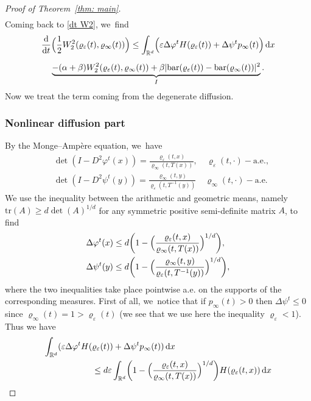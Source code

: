 \documentclass[10pt]{amsart}
\newcommand{\Bprt}[1]{\Bigl(#1\Bigr)}
\newcommand{\bbprt}[1]{\biggl(#1\biggr)}
\newcommand{\dx}[1]{\mathop{}\!\mathrm{d} #1}
\newcommand{\ddt}{\frac{\dx{}}{\dx{t}}}
\newcommand{\R}{\mathbb{R}}
\theoremstyle{plain}
\theoremstyle{remark}
\begin{document}
\begin{proof}[Proof of Theorem~\ref{thm: main}]
\begin{multline*}
\end{multline*}
Coming back to \eqref{dt W2}, we~find
\begin{multline}\label{final_singular}
\ddt \Bprt{\frac 12 W_2^2(\varrho_\varepsilon(t), \varrho_\infty(t))}\leq \int_{\R^d} \Bprt{\varepsilon\Delta \varphi^t H(\varrho_\varepsilon(t)) +\Delta \psi^t p_\infty(t) }\dx x \\[5pt]
\underbrace{- (\alpha+\beta) W_2^2(\varrho_\varepsilon(t), \varrho_\infty(t)) + \beta |\mathrm{bar}(\varrho_\varepsilon(t))- \mathrm{bar}(\varrho_\infty(t))|^2}_{I}.
\end{multline}
Now we treat the term coming from the degenerate diffusion.

\subsubsection*{Nonlinear diffusion part}
By the Monge--Ampère equation, we~have
\begin{align*}
&\det (I - D^2 \varphi^t(x)) = \frac{\varrho_\varepsilon(t,x)}{\varrho_\infty(t,T (x))}, \quad \varrho_{\varepsilon}(t,\cdot)-\mathrm{a.e.},\\
&\det (I - D^2 \psi^t(y)) = \frac{\varrho_\infty(t,y)}{\varrho_\varepsilon(t,T^{-1}(y))} \quad \varrho_{\infty}(t,\cdot)-\mathrm{a.e.}
\end{align*}
We use the inequality between the arithmetic and geometric means, namely $\mathrm{tr} (A) \geq d \det (A)^{1/d}$ for any symmetric positive semi-definite matrix $A$, to find
\begin{align*}
&\Delta \varphi^t(x)\leq d\bbprt{1-\Bprt{\frac{\varrho_\varepsilon(t,x)}{\varrho_\infty(t,T(x))}}^{1/d}}, \\
&\Delta \psi^t(y)\leq d\bbprt{1-\Bprt{\frac{\varrho_\infty(t,y)}{\varrho_\varepsilon(t,T^{-1}(y))}}^{1/d}},
\end{align*}
where the two inequalities take place pointwise a.e. on the supports of the corresponding measures.
First of all, we~notice that if $p_\infty(t)>0$ then $\Delta \psi^t\le 0$ since $\varrho_\infty(t)=1> \varrho_\varepsilon(t)$ (we see that we use here the inequality $ \varrho_\varepsilon<1$). Thus we have
\begin{equation*}
\begin{split}
\int_{\R^d} (\varepsilon \Delta \varphi^t H(&\varrho_\varepsilon(t)) +\Delta \psi^t p_\infty(t) )\dx x
\\
&\leq d \varepsilon \int_{\R^d} \bbprt{1-\Bprt{\frac{\varrho_\varepsilon(t,x)}{\varrho_\infty(t,T(x))}}^{1/d}} H(\varrho_\varepsilon(t,x)) \dx x\\

\end{split}
\end{equation*}
\end{proof}
\end{document}
